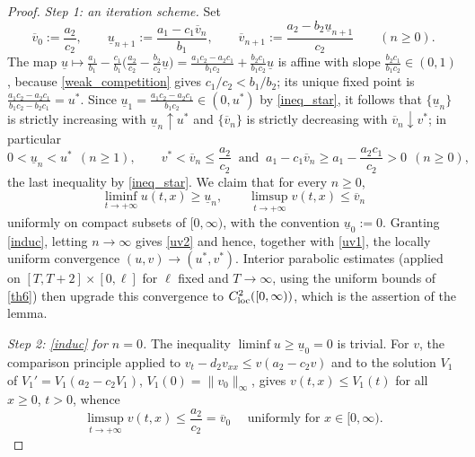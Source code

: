 \documentclass[reqno]{amsart}
\theoremstyle{plain}
\theoremstyle{definition}
\theoremstyle{remark}
\begin{document}
\begin{proof}
	\textit{Step 1: an iteration scheme.} Set
	\[
	\overline{v}_0:=\frac{a_2}{c_2},\qquad
	\underline{u}_{n+1}:=\frac{a_1-c_1\overline{v}_n}{b_1},\qquad
	\overline{v}_{n+1}:=\frac{a_2-b_2\underline{u}_{n+1}}{c_2}\qquad(n\ge0).
	\]
	The map $\underline u\mapsto \frac{a_1}{b_1}-\frac{c_1}{b_1}
	\big(\frac{a_2}{c_2}-\frac{b_2}{c_2}\underline u\big)
	=\frac{a_1c_2-a_2c_1}{b_1c_2}+\frac{b_2c_1}{b_1c_2}\underline u$ is affine with
	slope $\frac{b_2c_1}{b_1c_2}\in(0,1)$, because \eqref{weak_competition} gives
	$c_1/c_2<b_1/b_2$; its unique fixed point is
	$\frac{a_1c_2-a_2c_1}{b_1c_2-b_2c_1}=u^*$. Since
	$\underline{u}_1=\frac{a_1c_2-a_2c_1}{b_1c_2}\in(0,u^*)$ by
	\eqref{ineq_star}, it follows that $\{\underline{u}_n\}$ is strictly
	increasing with $\underline{u}_n\uparrow u^*$ and $\{\overline{v}_n\}$ is
	strictly decreasing with $\overline{v}_n\downarrow v^*$; in particular
	\begin{equation}\label{eq:pos_iter}
		0<\underline{u}_n<u^*\ \ (n\ge1),
		\qquad
		v^*<\overline{v}_n\le\frac{a_2}{c_2}
		\ \text{ and }\
		a_1-c_1\overline{v}_n\ge a_1-\frac{a_2c_1}{c_2}>0\ \ (n\ge0),
	\end{equation}
	the last inequality by \eqref{ineq_star}.
	We claim that for every $n\ge0$,
	\begin{equation}\label{induc}
		\liminf_{t \to +\infty} u(t,x) \ge \underline{u}_n,  \qquad \limsup_{t \to +\infty} v(t,x) \le \overline{v}_n
	\end{equation}
	uniformly on compact subsets of $[0,\infty)$, with the convention
	$\underline u_0:=0$. Granting \eqref{induc}, letting $n\to\infty$ gives
	\eqref{uv2} and hence, together with \eqref{uv1}, the locally uniform
	convergence $(u,v)\to(u^*,v^*)$. Interior parabolic estimates (applied on
	$[T,T+2]\times[0,\ell]$ for $\ell$ fixed and $T\to\infty$, using the uniform
	bounds of \cref{th6}) then upgrade this convergence to $C^2_{\rm loc}([0,\infty))$,
	which is the assertion of the lemma.

	\textit{Step 2: \eqref{induc} for $n=0$.} The inequality
	$\liminf u\ge\underline u_0=0$ is trivial. For $v$, the comparison principle
	applied to $v_t-d_2v_{xx}\le v(a_2-c_2v)$ and to the solution $V_1$ of
	$V_1'=V_1(a_2-c_2V_1)$, $V_1(0)=\|v_0\|_\infty$, gives $v(t,x)\le V_1(t)$ for
	all $x\ge0$, $t>0$, whence
	\begin{equation}\label{v1}
		\limsup_{t \to +\infty}{v(t,x)} \le \frac{a_2}{c_2} = \overline{v}_0
		\quad\text{ uniformly for } x \in [0,\infty).
	\end{equation}


\end{proof}
\end{document}
